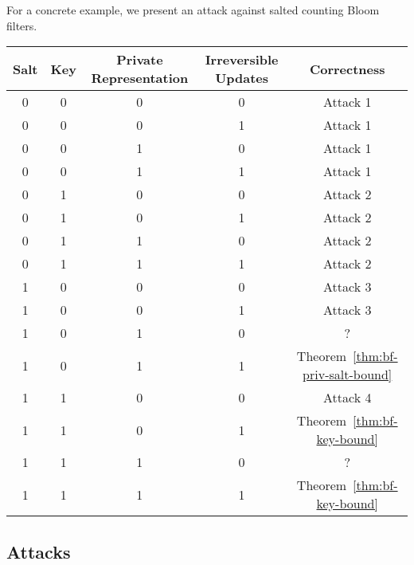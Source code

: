For a concrete example, we present an attack against salted counting Bloom filters.

\begin{center}
  \begin{tabular}{ | c | c | c | c | c | }
    \hline
    Salt & Key & Private Representation & Irreversible Updates & Correctness \\ \hline
    0 & 0 & 0 & 0 & Attack 1 \\ \hline
    0 & 0 & 0 & 1 & Attack 1 \\ \hline
    0 & 0 & 1 & 0 & Attack 1 \\ \hline
    0 & 0 & 1 & 1 & Attack 1 \\ \hline
    0 & 1 & 0 & 0 & Attack 2 \\ \hline
    0 & 1 & 0 & 1 & Attack 2 \\ \hline
    0 & 1 & 1 & 0 & Attack 2 \\ \hline
    0 & 1 & 1 & 1 & Attack 2 \\ \hline
    1 & 0 & 0 & 0 & Attack 3 \\ \hline
    1 & 0 & 0 & 1 & Attack 3 \\ \hline
    1 & 0 & 1 & 0 & ? \\ \hline
    1 & 0 & 1 & 1 & Theorem~\ref{thm:bf-priv-salt-bound} \\ \hline
    1 & 1 & 0 & 0 & Attack 4 \\ \hline
    1 & 1 & 0 & 1 & Theorem~\ref{thm:bf-key-bound} \\ \hline
    1 & 1 & 1 & 0 & ? \\ \hline
    1 & 1 & 1 & 1 & Theorem~\ref{thm:bf-key-bound} \\
    \hline
  \end{tabular}
\end{center}

\subsection{Attacks}

